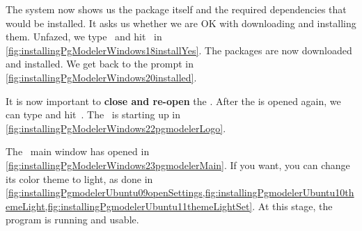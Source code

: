 The system now shows us the package itself and the required dependencies that would be installed.
It asks us whether we are OK with downloading and installing them.
Unfazed, we type~ and hit~\keys{\return} in \cref{fig:installingPgModelerWindows18installYes}.
The packages are now downloaded and installed.
We get back to the  prompt in \cref{fig:installingPgModelerWindows20installed}.

It is now important to \textbf{close and re-open} the  .
After the  is opened again, we can type  and hit~\keys{\return}.
The \pgmodeler\ is starting up in \cref{fig:installingPgModelerWindows22pgmodelerLogo}.

The \pgmodeler\ main window has opened in \cref{fig:installingPgModelerWindows23pgmodelerMain}.
If you want, you can change its color theme to light, as done in \cref{fig:installingPgmodelerUbuntu09openSettings,fig:installingPgmodelerUbuntu10themeLight,fig:installingPgmodelerUbuntu11themeLightSet}.
At this stage, the program is running and usable.%
%
\FloatBarrier%
\endhsection%
%
